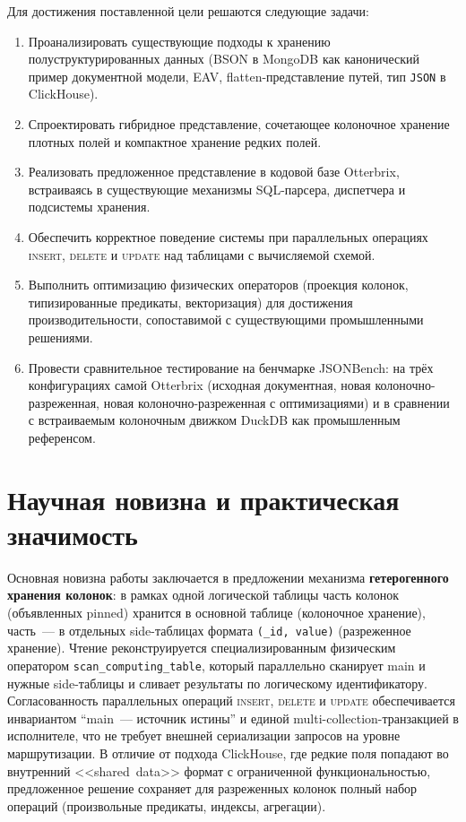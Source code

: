 Для достижения поставленной цели решаются следующие задачи:
\begin{enumerate}
    \item Проанализировать существующие подходы к хранению
    полуструктурированных данных (BSON в MongoDB как канонический
    пример документной модели, EAV, flatten-представление путей,
    тип \texttt{JSON} в ClickHouse).
    \item Спроектировать гибридное представление, сочетающее
    колоночное хранение плотных полей и компактное хранение
    редких полей.
    \item Реализовать предложенное представление в кодовой базе
    Otterbrix, встраиваясь в существующие механизмы SQL-парсера,
    диспетчера и подсистемы хранения.
    \item Обеспечить корректное поведение системы при
    параллельных операциях \textsc{insert}, \textsc{delete} и
    \textsc{update} над таблицами с вычисляемой схемой.
    \item Выполнить оптимизацию физических операторов (проекция
    колонок, типизированные предикаты, векторизация) для
    достижения производительности, сопоставимой с существующими
    промышленными решениями.
    \item Провести сравнительное тестирование на бенчмарке
    JSONBench: на трёх конфигурациях самой Otterbrix (исходная
    документная, новая колоночно-разреженная, новая
    колоночно-разреженная с оптимизациями) и в сравнении с
    встраиваемым колоночным движком DuckDB как промышленным
    референсом.
\end{enumerate}

\section{Научная новизна и практическая значимость}

Основная новизна работы заключается в предложении механизма
\textbf{гетерогенного хранения колонок}: в рамках одной логической
таблицы часть колонок (объявленных pinned) хранится в основной
таблице (колоночное хранение), часть~--- в отдельных side-таблицах
формата \texttt{(\_id, value)} (разреженное хранение). Чтение
реконструируется специализированным физическим оператором
\texttt{scan\_computing\_table}, который параллельно сканирует main
и нужные side-таблицы и сливает результаты по логическому
идентификатору. Согласованность параллельных операций \textsc{insert},
\textsc{delete} и \textsc{update} обеспечивается инвариантом
``main~--- источник истины'' и единой multi-collection-транзакцией
в исполнителе, что не требует внешней сериализации запросов на
уровне маршрутизации. В отличие от подхода ClickHouse, где редкие
поля попадают во внутренний <<shared~data>> формат с ограниченной
функциональностью, предложенное решение сохраняет для разреженных
колонок полный набор операций (произвольные предикаты, индексы,
агрегации).


